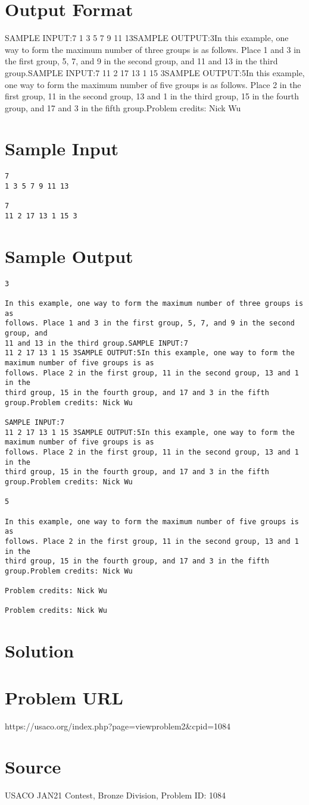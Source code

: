 \documentclass[12pt]{article}
\begin{document}
\section*{Output Format}
SAMPLE INPUT:7
1 3 5 7 9 11 13SAMPLE OUTPUT:3In this example, one way to form the maximum number of three groups is as
follows. Place 1 and 3 in the first group, 5, 7, and 9 in the second group, and
11 and 13 in the third group.SAMPLE INPUT:7
11 2 17 13 1 15 3SAMPLE OUTPUT:5In this example, one way to form the maximum number of five groups is as
follows. Place 2 in the first group, 11 in the second group, 13 and 1 in the
third group, 15 in the fourth group, and 17 and 3 in the fifth group.Problem credits: Nick Wu

\section*{Sample Input}
\begin{verbatim}
7
1 3 5 7 9 11 13

7
11 2 17 13 1 15 3
\end{verbatim}

\section*{Sample Output}
\begin{verbatim}
3

In this example, one way to form the maximum number of three groups is as
follows. Place 1 and 3 in the first group, 5, 7, and 9 in the second group, and
11 and 13 in the third group.SAMPLE INPUT:7
11 2 17 13 1 15 3SAMPLE OUTPUT:5In this example, one way to form the maximum number of five groups is as
follows. Place 2 in the first group, 11 in the second group, 13 and 1 in the
third group, 15 in the fourth group, and 17 and 3 in the fifth group.Problem credits: Nick Wu

SAMPLE INPUT:7
11 2 17 13 1 15 3SAMPLE OUTPUT:5In this example, one way to form the maximum number of five groups is as
follows. Place 2 in the first group, 11 in the second group, 13 and 1 in the
third group, 15 in the fourth group, and 17 and 3 in the fifth group.Problem credits: Nick Wu

5

In this example, one way to form the maximum number of five groups is as
follows. Place 2 in the first group, 11 in the second group, 13 and 1 in the
third group, 15 in the fourth group, and 17 and 3 in the fifth group.Problem credits: Nick Wu

Problem credits: Nick Wu

Problem credits: Nick Wu
\end{verbatim}

\section*{Solution}


\section*{Problem URL}
https://usaco.org/index.php?page=viewproblem2&cpid=1084

\section*{Source}
USACO JAN21 Contest, Bronze Division, Problem ID: 1084
\end{document}
